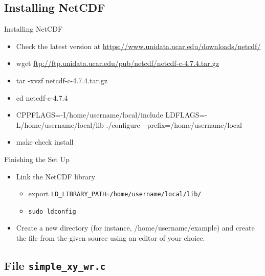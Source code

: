 \documentclass[compress,11pt,xcolor=svgnames,aspectratio=169]{beamer}
\begin{document}
\subsection{Installing NetCDF}

\begin{frame}[fragile]{Installing NetCDF}

\begin{itemize}
\setlength\itemsep{0.3cm}

  \item Check the latest version at \url{https://www.unidata.ucar.edu/downloads/netcdf/}
  \item {\footnotesize wget \url{ftp://ftp.unidata.ucar.edu/pub/netcdf/netcdf-c-4.7.4.tar.gz}}
  \item tar -xvzf netcdf-c-4.7.4.tar.gz
  \item cd netcdf-c-4.7.4
  \item CPPFLAGS=-I/home/username/local/include LDFLAGS=-L/home/username/local/lib ./configure {-}{-}prefix=/home/username/local
  \item make check install

\end{itemize}

\end{frame}

\begin{frame}[fragile]{Finishing the Set Up}

\begin{itemize}
\setlength\itemsep{0.8cm}
  \item Link the NetCDF library\\
  \begin{itemize}
  \setlength\itemsep{0.2cm}
    \item export \verb|LD_LIBRARY_PATH=/home/username/local/lib/|
    \item \verb|sudo ldconfig|
  \end{itemize}
  \item Create a new directory (for instance, /home/username/example) and create the file from the given source using an editor of your choice.

\end{itemize}

\end{frame}

\subsection{File \texttt{simple\_xy\_wr.c}}
\end{document}
